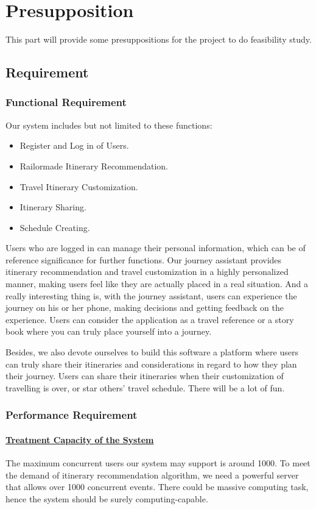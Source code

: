 \documentclass[10pt]{article}
\begin{document}
\section{Presupposition}
This part will provide some presuppositions for the project to do feasibility study.

\subsection{Requirement}
\subsubsection{Functional Requirement}
Our system includes but not limited to these functions: 

\begin{itemize}
  \item Register and Log in of Users.
  \item Railormade Itinerary Recommendation.
  \item Travel Itinerary Customization.
  \item Itinerary Sharing.
  \item Schedule Creating.
\end{itemize}

Users who are logged in can manage their personal information, which can be of reference significance for further functions. Our journey assistant provides itinerary recommendation and travel customization in a highly personalized manner, making users feel like they are actually placed in a real situation. And a really interesting thing is, with the journey assistant, users can experience the journey on his or her phone, making decisions and getting feedback on the experience. Users can consider the application as a travel reference or a story book where you can truly place yourself into a journey. 

Besides, we also devote ourselves to build this software a platform where users can truly share their itineraries and considerations in regard to how they plan their journey. Users can share their itineraries when their customization of travelling is over, or star others' travel schedule. There will be a lot of fun.

\subsubsection{Performance Requirement}
\paragraph{\underline{Treatment Capacity of the System}} The maximum concurrent users our system may support is around 1000. To meet the demand of itinerary recommendation algorithm, we need a powerful server that allows over 1000 concurrent events. There could be massive computing task, hence the system should be surely computing-capable.
\end{document}
